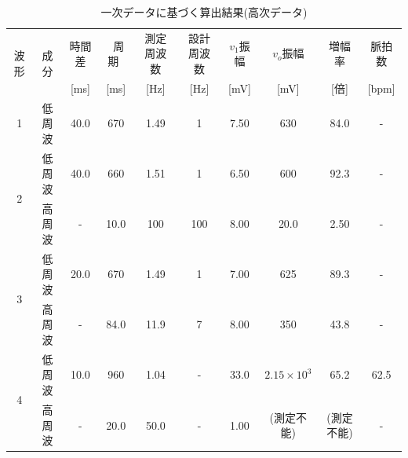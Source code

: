 \begin{table}[H]
  \caption{一次データに基づく算出結果(高次データ)}
  \centering
  \small
  \begin{tabular}{|c|c|c|c|c|c|c|c|c|c|}
    \hline
    \multirow{2}{*}{波形} & \multirow{2}{*}{成分} & 時間差 & ~周期~ & 測定周波数 & 設計周波数 & $v_1$振幅 & $v_o$振幅 & 増幅率 & 脈拍数 \\[-4pt]
    & & [ms] & [ms] & [Hz] & [Hz] & [mV] & [mV] & [倍] & [bpm] \\
    \hline \hline
    1 & 低周波 & 40.0 & 670 & 1.49 & 1 & 7.50 & 630 & 84.0 & - \\
    \hline
    \multirow{2}{*}{2} & 低周波 & 40.0 & 660 & 1.51 & 1 & 6.50 & 600 & 92.3 & - \\
    \cline{2-10}
    & 高周波 & - & 10.0 & 100 & 100 & 8.00 & 20.0 & 2.50 & - \\
    \hline
    \multirow{2}{*}{3} & 低周波 & 20.0 & 670 & 1.49 & 1 & 7.00 & 625 & 89.3 & - \\
    \cline{2-10}
    & 高周波 & - & 84.0 & 11.9 & 7 & 8.00 & 350 & 43.8 & - \\
    \hline
    \multirow{2}{*}{4} & 低周波 & 10.0 & 960 & 1.04 & - & 33.0 & $2.15 \times 10^3$ & 65.2 & 62.5 \\
    \cline{2-10}
    & 高周波 & - & 20.0 & 50.0 & - & 1.00 & (測定不能) & (測定不能) & - \\
    \hline
  \end{tabular}
  \label{tab:result1-3}
\end{table}



